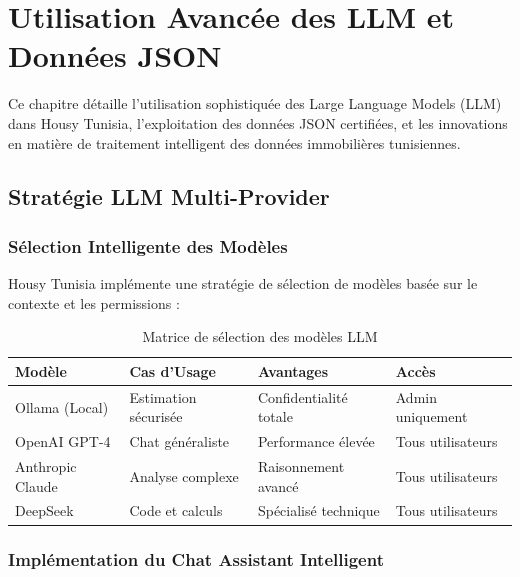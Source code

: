 
\chapter{Utilisation Avancée des LLM et Données JSON}
\label{chap:llm_donnees}

\begin{objectivebox}
Ce chapitre détaille l'utilisation sophistiquée des Large Language Models (LLM) dans Housy Tunisia, l'exploitation des données JSON certifiées, et les innovations en matière de traitement intelligent des données immobilières tunisiennes.
\end{objectivebox}

\section{Stratégie LLM Multi-Provider}

\subsection{Sélection Intelligente des Modèles}

Housy Tunisia implémente une stratégie de sélection de modèles basée sur le contexte et les permissions :

\begin{table}[H]
\centering
\caption{Matrice de sélection des modèles LLM}
\begin{tabular}{|l|l|l|l|}
\hline
\textbf{Modèle} & \textbf{Cas d'Usage} & \textbf{Avantages} & \textbf{Accès} \\
\hline
Ollama (Local) & Estimation sécurisée & Confidentialité totale & Admin uniquement \\
\hline
OpenAI GPT-4 & Chat généraliste & Performance élevée & Tous utilisateurs \\
\hline
Anthropic Claude & Analyse complexe & Raisonnement avancé & Tous utilisateurs \\
\hline
DeepSeek & Code et calculs & Spécialisé technique & Tous utilisateurs \\
\hline
\end{tabular}
\end{table}

\subsection{Implémentation du Chat Assistant Intelligent}

